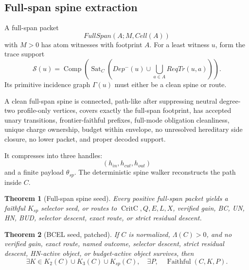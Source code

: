 \documentclass[10.5pt,a4paper]{article}
\newtheorem{theorem}{Theorem}[section]
\newcommand{\Sat}{\operatorname{Sat}}
\newcommand{\Comp}{\operatorname{Comp}}
\newcommand{\Faithful}{\operatorname{Faithful}}
\newcommand{\CritC}{\operatorname{CritC}}
\begin{document}
\subsection{Full-span spine extraction}
A full-span packet
\[
FullSpan(A;M,Cell(A))
\]
with \(M>0\) has atom witnesses with footprint \(A\). For a least witness \(u\), form the trace support
\[
\mathcal S(u)=\Comp(\Sat_C(Dep^-(u)\cup \bigcup_{a\in A}ReqTr(u,a))).
\]
Its primitive incidence graph \(\Gamma(u)\) must either be a clean spine or route.

A clean full-span spine is connected, path-like after suppressing neutral degree-two profile-only vertices, covers exactly the full-span footprint, has accepted unary transitions, frontier-faithful prefixes, full-mode obligation cleanliness, unique charge ownership, budget within envelope, no unresolved hereditary side closure, no lower packet, and proper decoded support.

It compresses into three handles:
\[
(h_{in},h_{cut},h_{out})
\]
and a finite payload \(\theta_{sp}\). The deterministic spine walker reconstructs the path inside \(C\).

\begin{theorem}[Full-span spine seed]
Every positive full-span packet yields a faithful \(K_{sp}\) selector seed, or routes to \(\CritC,Q,E,L,X\), verified gain, BC, UN, HN, BUD, selector descent, exact route, or strict residual descent.
\end{theorem}

\begin{theorem}[BCEL seed, patched]
If \(C\) is normalized, \(\Lambda(C)>0\), and no verified gain, exact route, named outcome, selector descent, strict residual descent, HN-active object, or budget-active object survives, then
\[
\exists K\in K_2(C)\cup K_3(C)\cup K_{sp}(C),\quad \exists P,
\quad \Faithful(C,K,P).
\]
\end{theorem}
\end{document}
